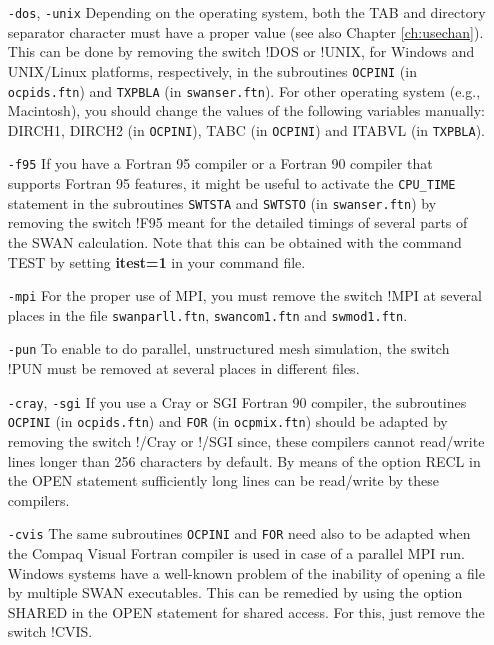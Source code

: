 \documentclass[12pt]{book}
\begin{document}
\begin{itemize}
  \item[{\tt -dos}, {\tt -unix}]
  Depending on the operating system, both the TAB and directory separator character must
  have a proper value (see also Chapter \ref{ch:usechan}). This can be done by removing
  the switch !DOS or !UNIX, for Windows and UNIX/Linux platforms, respectively, in the
  subroutines {\tt OCPINI} (in {\tt ocpids.ftn}) and {\tt TXPBLA} (in {\tt swanser.ftn}).
  For other operating system (e.g., Macintosh), you should change the values of the following
  variables manually: {\scriptsize DIRCH1}, {\scriptsize DIRCH2} (in {\tt OCPINI}),
  {\scriptsize TABC} (in {\tt OCPINI}) and {\scriptsize ITABVL} (in {\tt TXPBLA}).
  \item[{\tt -f95}]
  If you have a Fortran 95 compiler or a Fortran 90 compiler that supports Fortran 95
  features, it might be useful to activate the {\tt CPU\_TIME} statement in the subroutines
  {\tt SWTSTA} and {\tt SWTSTO} (in {\tt swanser.ftn}) by removing the switch !F95 meant for
  the detailed timings of several parts of the SWAN calculation. Note that this can be
  obtained with the command TEST by setting {\bf itest=1} in your command file.
  \item[{\tt -mpi}]
  For the proper use of MPI, you must remove the switch !MPI at several places in the file
  {\tt swanparll.ftn}, {\tt swancom1.ftn} and {\tt swmod1.ftn}.
  \item[{\tt -pun}]
  To enable to do parallel, unstructured mesh simulation, the switch !PUN must be removed
  at several places in different files.
  \item[{\tt -cray}, {\tt -sgi}]
  If you use a Cray or SGI Fortran 90 compiler, the subroutines {\tt OCPINI} (in {\tt ocpids.ftn})
  and {\tt FOR} (in {\tt ocpmix.ftn}) should be adapted by removing the switch !/Cray or !/SGI since,
  these compilers cannot read/write lines longer than 256 characters by default. By means
  of the option {\scriptsize RECL} in the OPEN statement sufficiently long lines can be
  read/write by these compilers.
  \item[{\tt -cvis}]
  The same subroutines {\tt OCPINI} and {\tt FOR} need also to be adapted when the Compaq Visual
  Fortran compiler is used in case of a parallel MPI run. Windows systems have a well-known problem
  of the inability of opening a file by multiple SWAN executables. This can be remedied by using the
  option {\scriptsize SHARED} in the OPEN statement for shared access. For this, just remove the
  switch !CVIS.

\end{itemize}
\end{document}

